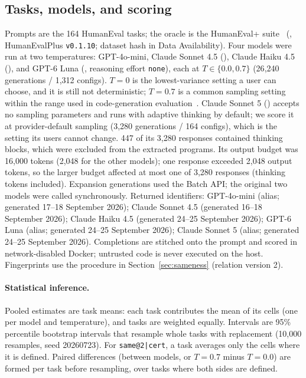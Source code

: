 \documentclass[acmsmall,screen,review,anonymous]{acmart}
\makeatletter
\newcommand{\sameatc}{\mbox{\texttt{same@2|cert}}}
\makeatother
\begin{document}
\subsection{Tasks, models, and scoring}
Prompts are the 164 HumanEval tasks; the oracle is the HumanEval+
suite~\cite{liu2023evalplus} (, HumanEvalPlus
\texttt{v0.1.10}; dataset hash in Data Availability).
Four models were run at two temperatures: GPT-4o-mini, Claude Sonnet 4.5
(), Claude Haiku 4.5
(), and GPT-6 Luna (,
reasoning effort \texttt{none}), each at $T\in\{0.0,0.7\}$
(26{,}240 generations / 1{,}312 configs).
$T{=}0$ is the lowest-variance setting a user can choose, and it is still not
deterministic; $T{=}0.7$ is a common sampling setting within the range used in
code-generation evaluation~\cite{chen2021evaluating}.
Claude Sonnet 5 () accepts no sampling parameters and
runs with adaptive thinking by default; we score it at provider-default
sampling (3{,}280 generations / 164 configs), which is the setting its users
cannot change.
447 of its 3{,}280 responses contained thinking blocks, which were excluded
from the extracted programs.
Its output budget was 16{,}000 tokens (2{,}048 for the other models); one
response exceeded 2{,}048 output tokens, so the larger budget affected at most one of 3{,}280 responses (thinking tokens included).
Expansion generations used the Batch API; the original two models were called
synchronously.
Returned identifiers:
GPT-4o-mini (alias; generated 17--18 September 2026);
Claude Sonnet 4.5  (generated 16--18 September 2026);
Claude Haiku 4.5  (generated 24--25 September 2026);
GPT-6 Luna  (alias; generated 24--25 September 2026);
Claude Sonnet 5  (alias; generated 24--25 September 2026).
Completions are stitched onto the prompt and scored in network-disabled
Docker; untrusted code is never executed on the host. Fingerprints use the procedure in Section~\ref{sec:sameness} (relation version 2).

\paragraph{Statistical inference.}
Pooled estimates are task means: each task contributes the mean of its
cells (one per model and temperature), and tasks are weighted equally.
Intervals are 95\% percentile bootstrap intervals that resample whole tasks
with replacement (10{,}000 resamples, seed 20260723).
For \sameatc{}, a task averages only the cells where it is defined.
Paired differences (between models, or $T{=}0.7$ minus $T{=}0.0$) are formed
per task before resampling, over tasks where both sides are defined.
\end{document}
